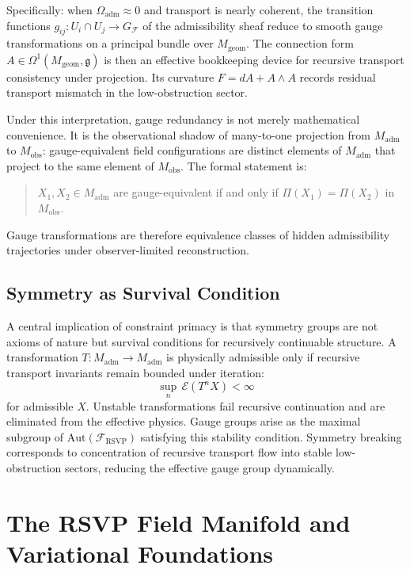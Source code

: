 \documentclass[12pt,a4paper]{article}
\newcommand{\RSVP}{\textrm{RSVP}}
\newcommand{\Sheaf}{\mathcal{F}}
\begin{document}
Specifically: when $\Omega_\mathrm{adm}\approx 0$ and transport is nearly
coherent, the transition functions $g_{ij}:U_i\cap U_j\to G_\mathcal{F}$ of
the admissibility sheaf reduce to smooth gauge transformations on a principal
bundle over $M_\mathrm{geom}$. The connection form $A\in\Omega^1(M_\mathrm{geom},
\mathfrak{g})$ is then an effective bookkeeping device for recursive transport
consistency under projection. Its curvature $F=dA+A\wedge A$ records residual
transport mismatch in the low-obstruction sector.

Under this interpretation, gauge redundancy is not merely mathematical
convenience. It is the observational shadow of many-to-one projection from
$M_\mathrm{adm}$ to $M_\mathrm{obs}$: gauge-equivalent field configurations
are distinct elements of $M_\mathrm{adm}$ that project to the same element of
$M_\mathrm{obs}$. The formal statement is:

\begin{quote}
$X_1, X_2 \in M_\mathrm{adm}$ are gauge-equivalent if and only if
$\Pi(X_1)=\Pi(X_2)$ in $M_\mathrm{obs}$.
\end{quote}

Gauge transformations are therefore equivalence classes of hidden admissibility
trajectories under observer-limited reconstruction.

\subsection{Symmetry as Survival Condition}

A central implication of constraint primacy is that symmetry groups are not
axioms of nature but survival conditions for recursively continuable structure.
A transformation $T:M_\mathrm{adm}\to M_\mathrm{adm}$ is physically admissible
only if recursive transport invariants remain bounded under iteration:
\[
\sup_n\,\mathcal{E}(T^n X) < \infty
\]
for admissible $X$. Unstable transformations fail recursive continuation and
are eliminated from the effective physics. Gauge groups arise as the maximal
subgroup of $\mathrm{Aut}(\Sheaf_\RSVP)$ satisfying this stability condition.
Symmetry breaking corresponds to concentration of recursive transport flow into
stable low-obstruction sectors, reducing the effective gauge group dynamically.

\section{The RSVP Field Manifold and Variational Foundations}
\end{document}
